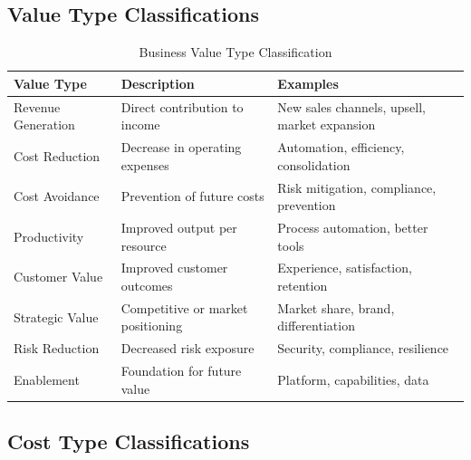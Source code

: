 \documentclass[11pt,letterpaper]{article}
\begin{document}
\subsection{Value Type Classifications}

\begin{table}[H]
\centering
\caption{Business Value Type Classification}
\small
\begin{tabular}{@{}L{2.5cm}L{4.5cm}L{5.5cm}@{}}
\toprule
\textbf{Value Type} & \textbf{Description} & \textbf{Examples} \\
\midrule
Revenue Generation & Direct contribution to income & New sales channels, upsell, market expansion \\
\addlinespace
Cost Reduction & Decrease in operating expenses & Automation, efficiency, consolidation \\
\addlinespace
Cost Avoidance & Prevention of future costs & Risk mitigation, compliance, prevention \\
\addlinespace
Productivity & Improved output per resource & Process automation, better tools \\
\addlinespace
Customer Value & Improved customer outcomes & Experience, satisfaction, retention \\
\addlinespace
Strategic Value & Competitive or market positioning & Market share, brand, differentiation \\
\addlinespace
Risk Reduction & Decreased risk exposure & Security, compliance, resilience \\
\addlinespace
Enablement & Foundation for future value & Platform, capabilities, data \\
\bottomrule
\end{tabular}
\end{table}

\subsection{Cost Type Classifications}
\end{document}
